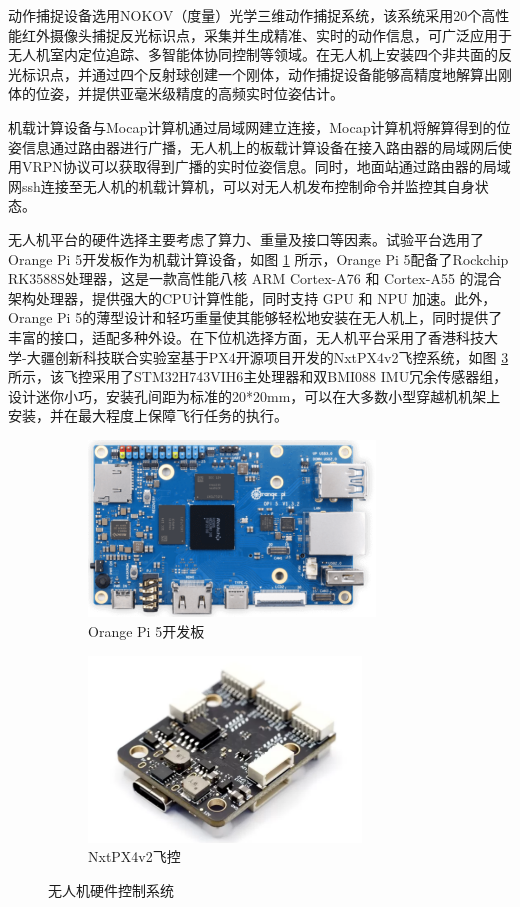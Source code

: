 \documentclass[lang=chs, degree=master, blindreview=false, winfonts=true]{yanputhesis}
\begin{document}
动作捕捉设备选用NOKOV（度量）光学三维动作捕捉系统，该系统采用20个高性能红外摄像头捕捉反光标识点，采集并生成精准、实时的动作信息，可广泛应用于无人机室内定位追踪、多智能体协同控制等领域。在无人机上安装四个非共面的反光标识点，并通过四个反射球创建一个刚体，动作捕捉设备能够高精度地解算出刚体的位姿，并提供亚毫米级精度的高频实时位姿估计。

机载计算设备与Mocap计算机通过局域网建立连接，Mocap计算机将解算得到的位姿信息通过路由器进行广播，无人机上的板载计算设备在接入路由器的局域网后使用VRPN协议可以获取得到广播的实时位姿信息。同时，地面站通过路由器的局域网ssh连接至无人机的机载计算机，可以对无人机发布控制命令并监控其自身状态。

无人机平台的硬件选择主要考虑了算力、重量及接口等因素。试验平台选用了Orange Pi 5开发板作为机载计算设备，如图 \ref{fig.fmtpath} 所示，Orange Pi 5配备了Rockchip RK3588S处理器，这是一款高性能八核 ARM Cortex-A76 和 Cortex-A55 的混合架构处理器，提供强大的CPU计算性能，同时支持 GPU 和 NPU 加速。此外，Orange Pi 5的薄型设计和轻巧重量使其能够轻松地安装在无人机上，同时提供了丰富的接口，适配多种外设。在下位机选择方面，无人机平台采用了香港科技大学-大疆创新科技联合实验室基于PX4开源项目开发的NxtPX4v2飞控系统，如图 \ref{fig.proximity-tra} 所示，该飞控采用了STM32H743VIH6主处理器和双BMI088 IMU冗余传感器组，设计迷你小巧，安装孔间距为标准的20*20mm，可以在大多数小型穿越机机架上安装，并在最大程度上保障飞行任务的执行。

\begin{figure}[htb!]
    \centering
    \begin{minipage}[t]{0.96\textwidth}
        \centering
        \begin{subfigure}[t]{0.47\textwidth}
            \centering
            \includegraphics[height = 1.85in]{picture/5_5.png}
            \caption{Orange Pi 5开发板\label{fig.fmtpath}}
        \end{subfigure}\hfill
        \begin{subfigure}[t]{0.47\textwidth}
            \centering
            \includegraphics[height = 1.95in]{picture/5_6.png}
            \caption{NxtPX4v2飞控\label{fig.proximity-tra}}
        \end{subfigure}
    \end{minipage}
    \caption{无人机硬件控制系统}
\end{figure}
\end{document}

